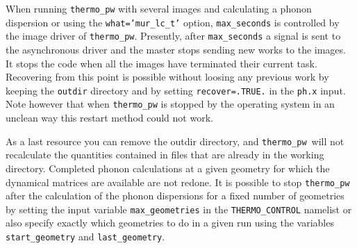 \documentclass[12pt,a4paper]{article}
\def\thermo{\texttt{thermo\_pw}}
\begin{document}
When running \texttt{thermo\_pw} with several images and
calculating a phonon dispersion or using the \texttt{what='mur\_lc\_t'}
option, \texttt{max\_seconds} is controlled by the image driver of 
\texttt{thermo\_pw}. Presently, after \texttt{max\_seconds} a signal
is sent to the asynchronous driver and the master stops sending new works 
to the images. It stops the code when all the images have terminated their
current task. Recovering from this point is possible without loosing 
any previous work by keeping the \texttt{outdir} directory and by setting 
\texttt{recover=.TRUE.} in the \texttt{ph.x} input.
Note however that when \texttt{thermo\_pw} is stopped by the operating 
system in an unclean way this restart method could not work.

As a last resource you can remove the outdir directory, and \thermo\ 
will not recalculate the quantities contained in files that are already 
in the working directory. Completed phonon calculations at a given
geometry for which the dynamical matrices are available are
not redone. It is possible to stop \texttt{thermo\_pw} after the 
calculation of the phonon dispersions for a fixed number of geometries 
by setting the input variable \texttt{max\_geometries} in the 
\texttt{THERMO\_CONTROL} namelist or also specify exactly which geometries
to do in a given run using the variables \texttt{start\_geometry} and
\texttt{last\_geometry}.
\end{document}
